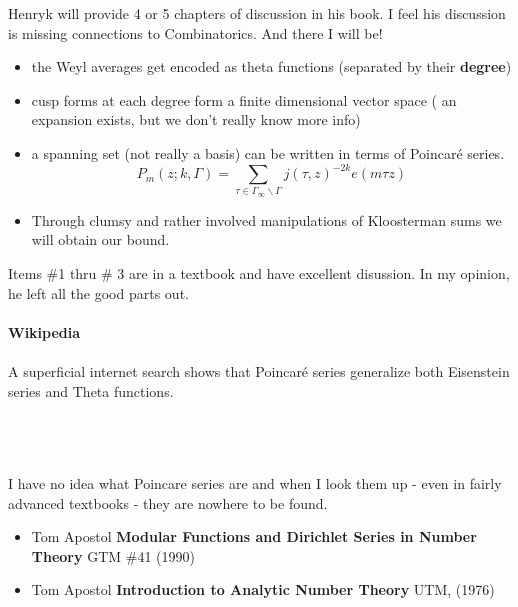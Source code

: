 \documentclass[12pt]{article}
\begin{document}
\newpage \noindent
Henryk will provide 4 or 5 chapters of discussion in his book.  I feel his discussion is missing connections to Combinatorics.  And there I will be!
\begin{itemize}
\item the Weyl averages get encoded as theta functions (separated by their \textbf{degree})
\item cusp forms at each degree form a finite dimensional vector space ( an expansion exists, but we don't really know more info) 
\item a spanning set (not really a basis) can be written in terms of Poincar\'{e} series. 
$$ P_m(z; k, \Gamma) =  \sum_{\tau  \in \Gamma_\infty \backslash \Gamma }
j(\tau, z)^{-2k} e(m\tau z)  $$
\item Through clumsy and rather involved manipulations of Kloosterman sums we will obtain our bound.
\end{itemize}
Items \#1 thru \# 3 are in a textbook and have excellent disussion.  In my opinion, he left all the good parts out.  \\ \\
{\color{red!50!orange!50!green} \textbf{Wikipedia}} \\ \\
A superficial internet search shows that Poincar\'{e} series generalize both Eisenstein series and Theta functions.  \\ \\
 \\ \\
I have no idea what Poincare series are and when I look them up - even in fairly advanced textbooks - they are nowhere to be found.
\begin{itemize}
\item Tom Apostol \textbf{Modular Functions and Dirichlet Series in Number Theory} GTM \#41 (1990) 
\item Tom Apostol \textbf{Introduction to Analytic Number Theory} UTM, (1976)
\end{itemize} 
\end{document}
